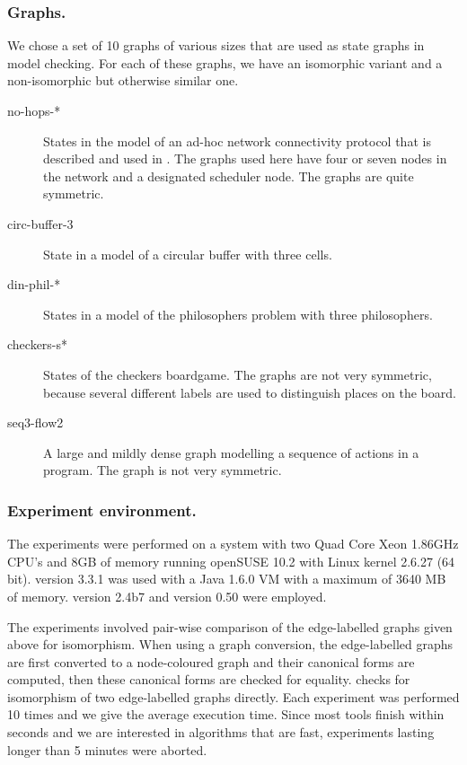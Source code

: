 \subsubsection{Graphs.}
We chose a set of 10 graphs of various sizes that are used as state graphs
in model checking. For each of these graphs, we have an isomorphic variant and
a non-isomorphic but otherwise similar one.
\begin{description}
\item[no-hops-*] States in the model of an ad-hoc network connectivity protocol
that is described and used in \cite{rensink2009:isomorphism}. The graphs used
here have four or seven nodes in the network and a designated scheduler node.
The graphs are quite symmetric.
\item[circ-buffer-3] State in a model of a circular buffer with three cells.
\item[din-phil-*] States in a model of the philosophers problem with three
philosophers.
\item[checkers-s*] States of the checkers boardgame. The graphs are not very
symmetric, because several different labels are used to distinguish places on
the board.
\item[seq3-flow2] A large and mildly dense graph modelling a sequence of
actions in a program. The graph is not very symmetric.
\end{description}

\subsubsection{Experiment environment.}
The experiments were performed on a system with two Quad Core Xeon 1.86GHz
CPU's and 8GB of memory running openSUSE 10.2 with Linux kernel 2.6.27 (64 bit).
\GROOVE version 3.3.1 was used with a Java 1.6.0 VM with a maximum of 3640 MB of
memory. \NAUTY version 2.4b7 \cite{mckay2008:nauty24} and \BLISS version 0.50
\cite{junttila2008:bliss} were employed.

The experiments involved pair-wise comparison of the edge-labelled graphs
given above for isomorphism. When using a graph conversion, the edge-labelled
graphs are first converted to a node-coloured graph and their canonical forms
are computed, then these canonical forms are checked for equality. \GROOVE
checks for isomorphism of two edge-labelled graphs directly. Each experiment was
performed 10 times and we give the average execution time. Since most tools
finish within seconds and we are interested in algorithms that are fast,
experiments lasting longer than 5 minutes were aborted.

